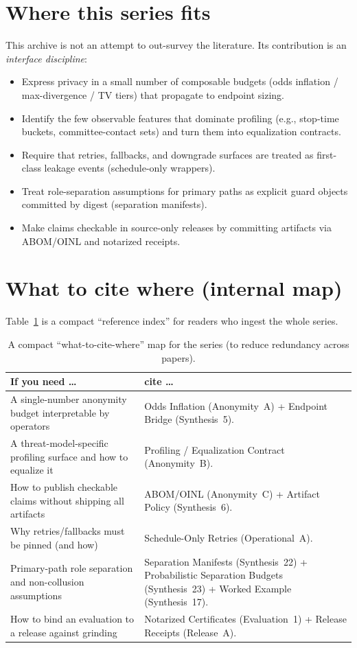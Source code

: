 \documentclass[11pt]{article}
\begin{document}
\section{Where this series fits}
This archive is not an attempt to out-survey the literature.
Its contribution is an \emph{interface discipline}:
\begin{itemize}[leftmargin=1.2em]
\item Express privacy in a small number of composable budgets (odds inflation / max-divergence / TV tiers) that propagate to endpoint sizing.\cite{series:oddsinflation,series:endpointbridge}
\item Identify the few observable features that dominate profiling (e.g., stop-time buckets, committee-contact sets) and turn them into equalization contracts.\cite{series:profiling}
\item Require that retries, fallbacks, and downgrade surfaces are treated as first-class leakage events (schedule-only wrappers).\cite{series:operationalA}
\item Treat role-separation assumptions for primary paths as explicit guard objects committed by digest (separation manifests).\cite{series:primarysepmanifest}
\item Make claims checkable in source-only releases by committing artifacts via ABOM/OINL and notarized receipts.\cite{series:abomoinl,series:releaseproperty}
\end{itemize}

\section{What to cite where (internal map)}
Table~\ref{tab:map} is a compact ``reference index'' for readers who ingest the whole series.

\begin{table}[t]
\centering
\begin{tabularx}{\linewidth}{@{}lX@{}}
\toprule
If you need \dots & cite \dots \\
\midrule
A single-number anonymity budget interpretable by operators & Odds Inflation (Anonymity~A) + Endpoint Bridge (Synthesis~5). \\
A threat-model-specific profiling surface and how to equalize it & Profiling / Equalization Contract (Anonymity~B). \\
How to publish checkable claims without shipping all artifacts & ABOM/OINL (Anonymity~C) + Artifact Policy (Synthesis~6). \\
Why retries/fallbacks must be pinned (and how) & Schedule-Only Retries (Operational~A). \\
Primary-path role separation and non-collusion assumptions & Separation Manifests (Synthesis~22) + Probabilistic Separation Budgets (Synthesis~23) + Worked Example (Synthesis~17). \\
How to bind an evaluation to a release against grinding & Notarized Certificates (Evaluation~1) + Release Receipts (Release~A). \\
\bottomrule
\end{tabularx}
\caption{A compact ``what-to-cite-where'' map for the series (to reduce redundancy across papers).}
\label{tab:map}
\end{table}
\end{document}
